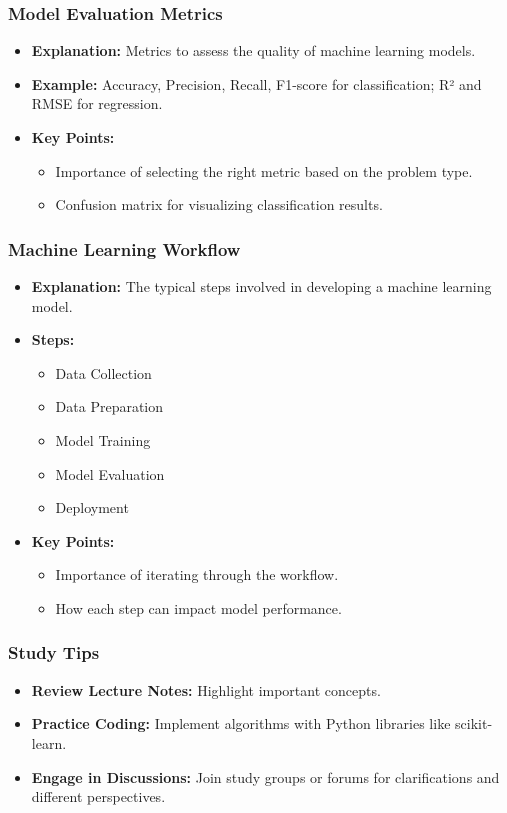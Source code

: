 \documentclass[aspectratio=169]{beamer}
\begin{document}
\begin{frame}[fragile]
    \frametitle{Model Evaluation Metrics}
    \begin{itemize}
        \item \textbf{Explanation:} Metrics to assess the quality of machine learning models.
        \item \textbf{Example:} Accuracy, Precision, Recall, F1-score for classification; R² and RMSE for regression.
        \item \textbf{Key Points:}
        \begin{itemize}
            \item Importance of selecting the right metric based on the problem type.
            \item Confusion matrix for visualizing classification results.
        \end{itemize}
    \end{itemize}
\end{frame}

\begin{frame}[fragile]
    \frametitle{Machine Learning Workflow}
    \begin{itemize}
        \item \textbf{Explanation:} The typical steps involved in developing a machine learning model.
        \item \textbf{Steps:}
        \begin{itemize}
            \item Data Collection
            \item Data Preparation
            \item Model Training
            \item Model Evaluation
            \item Deployment
        \end{itemize}
        \item \textbf{Key Points:}
        \begin{itemize}
            \item Importance of iterating through the workflow.
            \item How each step can impact model performance.
        \end{itemize}
    \end{itemize}
\end{frame}

\begin{frame}[fragile]
    \frametitle{Study Tips}
    \begin{itemize}
        \item \textbf{Review Lecture Notes:} Highlight important concepts.
        \item \textbf{Practice Coding:} Implement algorithms with Python libraries like scikit-learn.
        \item \textbf{Engage in Discussions:} Join study groups or forums for clarifications and different perspectives.
    \end{itemize}
\end{frame}
\end{document}
